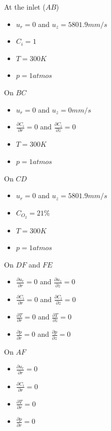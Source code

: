 \noindent At the inlet ($AB$)
\begin{itemize}
\item $u_r = 0$ and $u_z=5801.9 mm/s$
\item $C_i = 1$ 
\item $T = 300K$
\item $p=1 atmos$
\end{itemize}

\bigskip 
\noindent On $BC$
\begin{itemize}
\item $u_r = 0$ and $u_z=0 mm/s$
\item $\frac{\partial C_i}{\partial r} =0 $ and $\frac{\partial C_i}{\partial z} =0 $
\item $T = 300K$
\item $p=1 atmos$
\end{itemize}

\noindent On $CD$
\begin{itemize}
\item $u_r = 0$ and $u_z=5801.9 mm/s$
\item $ C_{O_2} =21 \% $
\item $T = 300K$
\item $p=1 atmos$
\end{itemize}

\noindent On $DF$ and $FE$
\begin{itemize}
\item $\frac{\partial u_r}{\partial r} =0 $ and $\frac{\partial u_z}{\partial z} =0 $
\item $\frac{\partial C_i}{\partial r} =0 $ and $\frac{\partial C_i}{\partial z} =0 $
\item $\frac{\partial T}{\partial r} =0 $ and $\frac{\partial T}{\partial z} =0 $
\item $\frac{\partial p}{\partial r} =0 $ and $\frac{\partial p}{\partial z} =0 $
\end{itemize}


\noindent On $AF$
\begin{itemize}
\item $\frac{\partial u_r}{\partial r} =0 $ 
\item $\frac{\partial C_i}{\partial r} =0 $ 
\item $\frac{\partial T}{\partial r} =0 $  
\item $\frac{\partial p}{\partial r} =0 $
\end{itemize}







